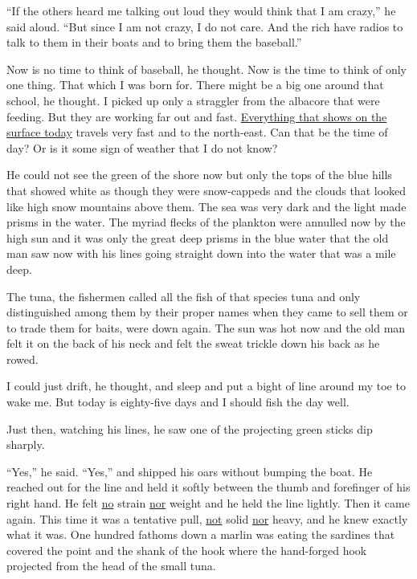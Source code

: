 \documentclass[fontset=ubuntu,zihao=-4]{ctexrep}
\begin{document}
``If the others heard me talking out loud they would think that I am
crazy,'' he said aloud. ``But since I am not crazy, I do not care. And the
rich have radios to talk to them in their boats and to bring them the
baseball.''

Now is no time to think of baseball, he thought. Now is the time to think of
only one thing. That which I was born for. There might be a big one around
that school, he thought. I picked up only a \gls{straggler} from the
albacore that were feeding. But they are working far out and fast.
\uline{Everything that shows on the surface today} travels very fast and to the
north-east. Can that be the time of day? Or is it some \gls{sign} of weather that
I do not know?

He could not see the green of the shore now but only the tops of the blue
hills that showed white as though they were snow-\glspl{capped} and the
clouds that looked like high snow mountains above them. The sea was very
dark and the light made \glspl{prism} in the water. The \gls{myriad}
\glspl{fleck} of the plankton were \gls{annulled} now by the high sun and it
was only the great deep prisms in the blue water that the old man saw now
with his lines going straight down into the water that was a mile deep.

The tuna, the fishermen called all the fish of that \gls{species} tuna and
only \gls{distinguished} \gls{among} them by their proper names when they
came to sell them or to trade them for baits, were down again. The sun was
hot now and the old man felt it on the back of his neck and felt the \gls{sweat}
\gls{trickle} down his back as he rowed.

I could just drift, he thought, and sleep and put a \gls{bight} of line
around my \gls{toe} to wake me. But today is eighty-five days and I should
fish the day well.

Just then, watching his lines, he saw one of the projecting green
sticks dip sharply.

``Yes,'' he said. ``Yes,'' and shipped his oars without \gls{bumping} the
boat. He reached out for the line and held it softly between the \gls{thumb}
and \gls{forefinger} of his right hand. He felt \uline{no} \gls{strain}
\uline{nor} weight and he held the line lightly. Then it came again. This
time it was a \gls{tentative} pull, \uline{not} \gls{solid} \uline{nor}
heavy, and he knew exactly what it was. One hundred fathoms down a marlin
was eating the sardines that covered the point and the shank of the hook
where the hand-\gls{forged} hook projected from the head of the small tuna.
\end{document}

